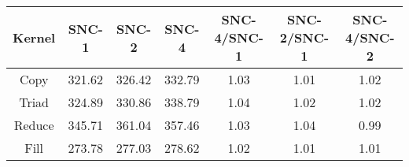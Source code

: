 \begin{tabular}{|c|c|c|c|c|c|c|}  \hline
Kernel&SNC-1&SNC-2&SNC-4 & SNC-4/SNC-1 & SNC-2/SNC-1 & SNC-4/SNC-2 \\ \hline 
Copy & 321.62 & 326.42 & 332.79  & 1.03 & 1.01 & 1.02 \\ \hline 
Triad & 324.89 & 330.86 & 338.79  & 1.04 & 1.02 & 1.02 \\ \hline 
Reduce & 345.71 & 361.04 & 357.46  & 1.03 & 1.04 & 0.99 \\ \hline 
Fill & 273.78 & 277.03 & 278.62  & 1.02 & 1.01 & 1.01 \\ \hline 
\end{tabular}
